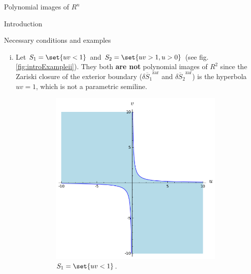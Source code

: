 \documentclass[11pt, a4paper, english, twoside, notitlepage]{report}
\begin{document}
\begin{chapter}{Polynomial images of $R^n$}
\begin{section}{Introduction}
\begin{subsection}{Necessary conditions and examples}
\begin{example}
\begin{enumerate}[(i)]
			\item Let $S_1 = \set{uv < 1}$ and $S_2 = \set{uv > 1, u > 0}$ (see fig. \ref{fig:introExampleii}).
			They both \textbf{are not} polynomial images of $R^2$ since the Zariski closure of the exterior boundary ($\overline{\delta S_1}^{\text{zar}}$ and $\overline{\delta S_2}^{\text{zar}}$) is the hyperbola $uv = 1$, which is not a parametric semiline.
			
			\begin{figure}[h]
				\begin{subfigure}{.55\linewidth}\centering
					\includegraphics[width=1\textwidth]{plots/ch1_01_S_1.png}
					\caption{$S_1 = \set{uv < 1}$.\label{fig:S_1}}
				\end{subfigure}
				\begin{subfigure}{.55\linewidth}\centering

\end{subfigure}
\end{figure}
\end{enumerate}
\end{example}
\end{subsection}
\end{section}
\end{chapter}
\end{document}

